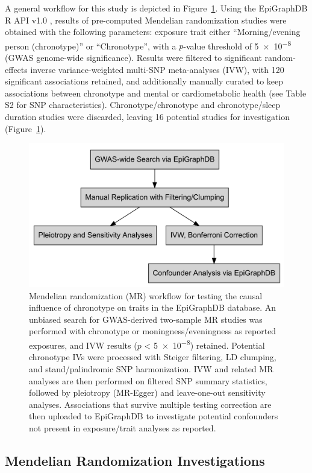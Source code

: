 \documentclass[genes,article,accept,moreauthors,pdftex]{Definitions/mdpi}
\begin{document}
A general workflow for this study is depicted in Figure~\ref{fig:MR_Workflow}. Using the EpiGraphDB R API v1.0 \cite{liu_epigraphdb_2020}, results of pre-computed Mendelian randomization studies were obtained with the following parameters: exposure trait either ``Morning/evening person (chronotype)'' or ``Chronotype'', with a $p$-value threshold of \num{5e-8} (GWAS genome-wide significance). Results were filtered to significant {random}-effects inverse variance-weighted multi-SNP meta-analyses (IVW), with 120 significant associations retained, and additionally manually curated to keep associations between chronotype and mental or cardiometabolic health (see Table S2 for SNP characteristics). Chronotype/chronotype and chronotype/sleep duration studies were discarded, leaving 16 potential studies for investigation (Figure~\ref{fig:MR_Workflow}).
\begin{figure}[H]
	\includegraphics[width=0.9\linewidth]{Figs/Analysis1/outline.png}
	\caption{Mendelian randomization (MR) workflow for testing the causal influence of chronotype on traits in the EpiGraphDB database. An unbiased search for GWAS-derived two-sample MR studies was performed with chronotype or moningness/eveningness as reported exposures, and IVW results ($p$ < \num{5e-8}) retained. Potential chronotype IVs were processed with Steiger filtering, LD clumping, and stand/palindromic SNP harmonization. IVW and related MR analyses are then performed on filtered SNP summary statistics, followed by pleiotropy (MR-Egger) and leave-one-out sensitivity analyses. Associations that survive multiple testing correction are then uploaded to EpiGraphDB to investigate potential confounders not present in exposure/trait analyses as reported.}
	\label{fig:MR_Workflow}
\end{figure}

\subsection{Mendelian Randomization Investigations}
\end{document}
